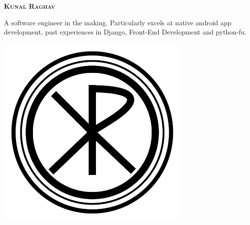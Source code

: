 \documentclass[9pt,a4paper]{extarticle}
\begin{document}
\noindent
\begin{minipage}{0.6\textwidth}
\begin{Huge}
\bfseries{\textsc{Kunal Raghav}}\\					
\end{Huge}
\begin{flushleft}
A software engineer in the making. Particularly excels at native android app development, past
experiences in Django, Front-End Development and python-fu.
\end{flushleft}
\end{minipage}%
\hfill%
\begin{minipage}{0.2\textwidth}
\includegraphics[width=\textwidth]{photo}
\end{minipage}
\\
\makebox[\textwidth]{\rule{\textwidth}{0.01pt}}
\\
\end{document}
